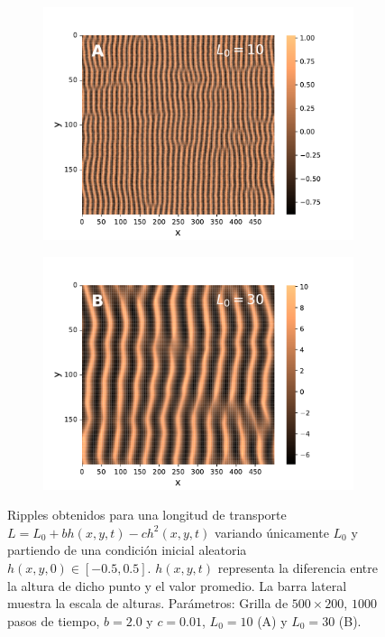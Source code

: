 \documentclass[11pt,twocolumn,twoside]{opticajnl}
\begin{document}
\begin{figure}[H]
\centering
     \begin{subfigure}[b]{\linewidth}
        \includegraphics[width=\textwidth]{Figuras/ripple_L0=10.pdf}
         \label{fig:ripple_L0=10}
         \vspace{-1.5cm}
     \end{subfigure}
     \begin{subfigure}[b]{\linewidth}
         \includegraphics[width=\textwidth]{Figuras/ripple_L0=30.pdf}
         \label{fig:ripple_L0=30}
     \end{subfigure}
\caption{\centering Ripples obtenidos para una longitud de transporte $L = L_0 + bh(x,y,t) - ch^2(x,y,t)$ variando únicamente $L_0$  y partiendo de una condición inicial aleatoria $h(x,y,0) \in [-0.5,0.5]$. $h(x,y,t)$ representa la diferencia entre la altura de dicho punto y el valor promedio. La barra lateral muestra la escala de alturas. Parámetros: Grilla de $500 \times 200$, $1000$ pasos de tiempo, $b=2.0$ y $c=0.01$, $L_0 = 10$ (A) y $L_0 = 30$ (B).} 
\label{fig:ripples}
\end{figure}
\end{document}
